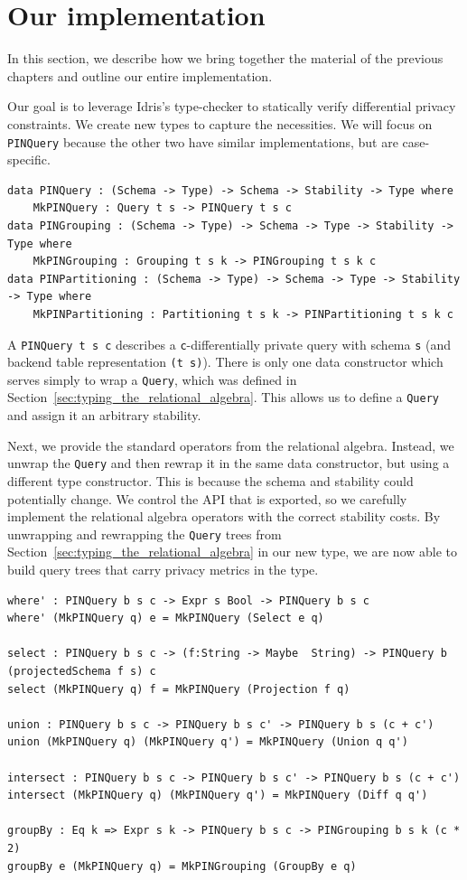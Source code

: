 \documentclass[12pt]{article}
\begin{document}
\section{Our implementation}\label{sec:our_implementation}

In this section, we describe how we bring together the material of the previous chapters and outline our entire implementation.

Our goal is to leverage Idris's type-checker to statically verify differential privacy constraints.
We create new types to capture the necessities.
We will focus on \texttt{PINQuery} because the other two have similar implementations, but are case-specific.

\begin{lstlisting}
data PINQuery : (Schema -> Type) -> Schema -> Stability -> Type where
    MkPINQuery : Query t s -> PINQuery t s c
data PINGrouping : (Schema -> Type) -> Schema -> Type -> Stability -> Type where
    MkPINGrouping : Grouping t s k -> PINGrouping t s k c
data PINPartitioning : (Schema -> Type) -> Schema -> Type -> Stability -> Type where
    MkPINPartitioning : Partitioning t s k -> PINPartitioning t s k c
\end{lstlisting}

A \texttt{PINQuery t s c} describes a \texttt{c}-differentially private query with schema \texttt{s} (and backend table representation \texttt{(t s)}).
There is only one data constructor which serves simply to wrap a \texttt{Query}, which was defined in Section~\ref{sec:typing_the_relational_algebra}.
This allows us to define a \texttt{Query} and assign it an arbitrary stability.

Next, we provide the standard operators from the relational algebra.
Instead, we unwrap the \texttt{Query} and then rewrap it in the same data constructor, but using a different type constructor.
This is because the schema and stability could potentially change.
We control the API that is exported, so we carefully implement the relational algebra operators with the correct stability costs.
By unwrapping and rewrapping the \texttt{Query} trees from Section~\ref{sec:typing_the_relational_algebra} in our new type, we are now able to build query trees that carry privacy metrics in the type.

\begin{lstlisting}
where' : PINQuery b s c -> Expr s Bool -> PINQuery b s c
where' (MkPINQuery q) e = MkPINQuery (Select e q)

select : PINQuery b s c -> (f:String -> Maybe  String) -> PINQuery b (projectedSchema f s) c
select (MkPINQuery q) f = MkPINQuery (Projection f q)

union : PINQuery b s c -> PINQuery b s c' -> PINQuery b s (c + c')
union (MkPINQuery q) (MkPINQuery q') = MkPINQuery (Union q q')

intersect : PINQuery b s c -> PINQuery b s c' -> PINQuery b s (c + c')
intersect (MkPINQuery q) (MkPINQuery q') = MkPINQuery (Diff q q')

groupBy : Eq k => Expr s k -> PINQuery b s c -> PINGrouping b s k (c * 2)
groupBy e (MkPINQuery q) = MkPINGrouping (GroupBy e q)
\end{lstlisting}
\end{document}
